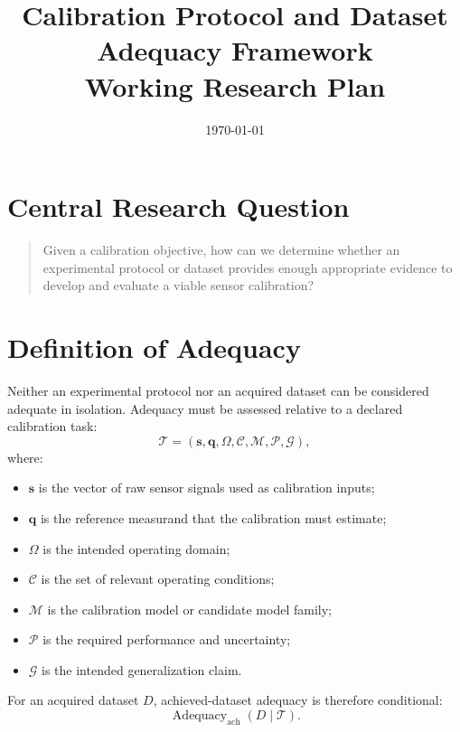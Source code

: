 \documentclass[11pt,a4paper]{article}
\title{Calibration Protocol and Dataset Adequacy Framework\\Working Research Plan}
\author{}
\date{\today}
\begin{document}
\maketitle

\tableofcontents

\newpage

\section{Central Research Question}

\begin{quote}
Given a calibration objective, how can we determine whether an experimental
protocol or dataset provides enough appropriate evidence to develop and
evaluate a viable sensor calibration?
\end{quote}

\section{Definition of Adequacy}

Neither an experimental protocol nor an acquired dataset can be considered
adequate in isolation. Adequacy must be assessed relative to a declared
calibration task:
\begin{equation}
    \mathcal{T}
    =
    \left(
        \mathbf{s},
        \mathbf{q},
        \Omega,
        \mathcal{C},
        \mathcal{M},
        \mathcal{P},
        \mathcal{G}
    \right),
\end{equation}
where:
\begin{itemize}
    \item $\mathbf{s}$ is the vector of raw sensor signals used as calibration
        inputs;
    \item $\mathbf{q}$ is the reference measurand that the calibration must
        estimate;
    \item $\Omega$ is the intended operating domain;
    \item $\mathcal{C}$ is the set of relevant operating conditions;
    \item $\mathcal{M}$ is the calibration model or candidate model family;
    \item $\mathcal{P}$ is the required performance and uncertainty;
    \item $\mathcal{G}$ is the intended generalization claim.
\end{itemize}

For an acquired dataset $D$, achieved-dataset adequacy is therefore
conditional:
\begin{equation}
    \operatorname{Adequacy}_{\mathrm{ach}}
    \left(D \mid \mathcal{T}\right).
\end{equation}
\end{document}

